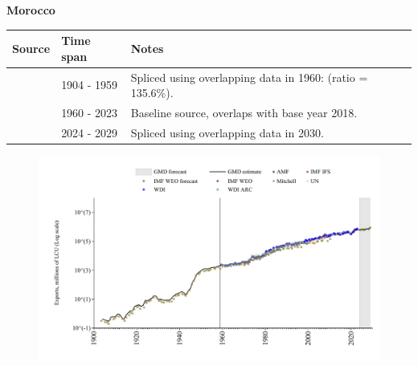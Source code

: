 \documentclass[12pt,a4paper,landscape]{article}
\begin{document}
\begin{adjustbox}{max totalsize={\paperwidth}{\paperheight},center}
\begin{minipage}[t][\textheight][t]{\textwidth}
\vspace*{0.5cm}
{}
\begin{center}
{\Large\bfseries Morocco}
\end{center}
\vspace{0.5cm}
\begin{table}[H]
\centering
\small
\begin{tabular}{|l|l|l|}
\hline
\textbf{Source} & \textbf{Time span} & \textbf{Notes} \\
\hline
\rowcolor{white}\cite{Mitchell}& 1904 - 1959 &Spliced using overlapping data in 1960: (ratio = 135.6\%).\\
\rowcolor{lightgray}\cite{WDI}& 1960 - 2023 &Baseline source, overlaps with base year 2018.\\
\rowcolor{white}\cite{IMF_WEO_forecast}& 2024 - 2029 &Spliced using overlapping data in 2030.\\
\hline
\end{tabular}
\end{table}
\begin{figure}[H]
\centering
\includegraphics[width=\textwidth,height=0.6\textheight,keepaspectratio]{graphs/MAR_exports.pdf}
\end{figure}
\end{minipage}
\end{adjustbox}
\end{document}
